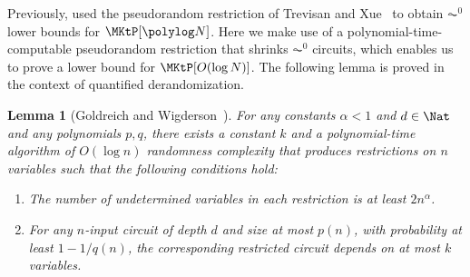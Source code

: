 \documentclass[11pt]{article}
\numberwithin{equation}{section}
\newtheorem{lemma}[theorem]{Lemma}
\theoremstyle{definition}
\theoremstyle{plain}
\begin{document}
Previously, \cite{ChenHOPRS20_innovations_conf} used the pseudorandom restriction of Trevisan and Xue~\cite{TrevisanX13_coco_conf}
to obtain $\AC^0$ lower bounds for $\MKtP[\polylog N]$.
Here we make use of a polynomial-time-computable pseudorandom restriction that shrinks $\AC^0$ circuits,
which enables us to prove a lower bound for $\MKtP[O(\log N)]$.
The following lemma is proved in the context of quantified derandomization.
\begin{lemma}
  [Goldreich and Wigderson~\cite{GoldreichW14_stoc_conf}]
  \label{lemma_pseudorandomrestriction}
  For any constants $\alpha < 1$ and $d \in \Nat$ and any polynomials $p, q$,
  there exists a constant $k$ and a polynomial-time algorithm of $O(\log n)$ randomness complexity that
  produces restrictions on $n$ variables such that the following conditions hold:
  \begin{enumerate}
    \item
          The number of undetermined variables in each restriction is at least $2 n^\alpha$.
    \item
          For any $n$-input circuit of depth $d$ and size at most $p(n)$,
          with probability at least $1 - 1 / q(n)$,
          the corresponding restricted circuit depends on at most $k$ variables.
  \end{enumerate}
\end{lemma}
\end{document}
